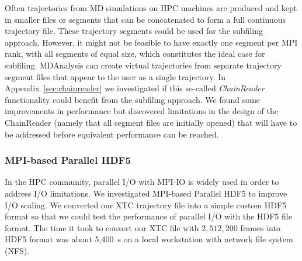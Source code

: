 Often trajectories from MD simulations on HPC machines are produced and kept in smaller files or segments that can be concatenated to form a full continuous trajectory file.
These trajectory segments could be used for the subfiling approach.
However, it might not be feasible to have exactly one segment per MPI rank, with all segments of equal size, which constitutes the ideal case for subfiling.
MDAnalysis can create virtual trajectories from separate trajectory segment files that appear to the user as a single trajectory.
In Appendix~\ref{sec:chainreader} we investigated if this so-called \emph{ChainReader} functionality could benefit from the subfiling approach.
We found some improvements in performance but discovered limitations in the design of the ChainReader (namely that all segment files are initially opened) that will have to be addressed before equivalent performance can be reached.
 
\subsubsection{MPI-based Parallel HDF5}
\label{HDF5}

In the HPC community, parallel I/O with MPI-IO is widely used in order to address I/O limitations.
We investigated MPI-based Parallel HDF5 to improve I/O scaling. 
We converted our XTC trajectory file into a simple custom HDF5 format so that we could test the performance of parallel I/O with the HDF5 file format.
The time it took to convert our XTC file with $2,512,200$ frames into HDF5 format was about 5,400~s on a local workstation with network file system (NFS).

